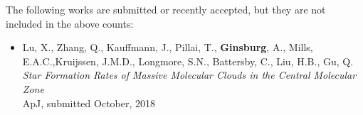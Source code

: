 \vspace{24pt}
The following works are submitted or recently accepted, but they are not
included in the above counts:

\begin{itemize}
% 

%

\item Lu, X., Zhang, Q., Kauffmann, J.,  Pillai, T.,  
    \textbf{Ginsburg}, A.,  Mills, E.A.C.,Kruijssen, J.M.D., 
    Longmore, S.N.,  Battersby, C.,   Liu, H.B.,  Gu, Q. \\
    \textit{Star Formation Rates of Massive Molecular Clouds in the Central Molecular Zone}\\
    ApJ, submitted October, 2018

    
\end{itemize}
